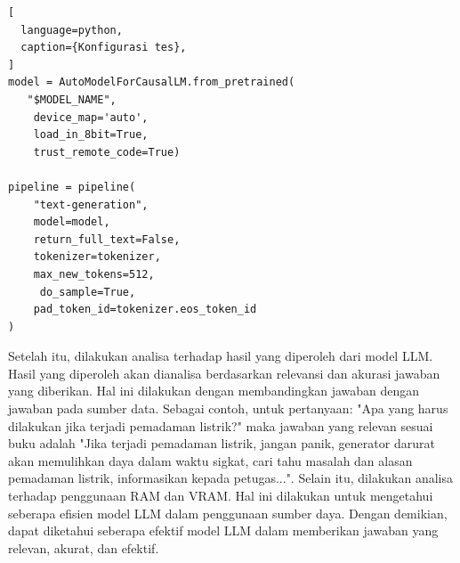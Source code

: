 \begin{lstlisting}[
  language=python,
  caption={Konfigurasi tes},
]
model = AutoModelForCausalLM.from_pretrained(
   "$MODEL_NAME",
    device_map='auto',
    load_in_8bit=True,
    trust_remote_code=True)

pipeline = pipeline(
    "text-generation",
    model=model,
    return_full_text=False,
    tokenizer=tokenizer,
    max_new_tokens=512,
     do_sample=True,
    pad_token_id=tokenizer.eos_token_id
)
\end{lstlisting}

Setelah itu, dilakukan analisa terhadap hasil yang diperoleh dari model LLM. Hasil yang diperoleh akan dianalisa berdasarkan relevansi dan akurasi jawaban yang diberikan. Hal ini dilakukan dengan membandingkan jawaban dengan jawaban pada sumber data. Sebagai contoh, untuk pertanyaan: "Apa yang harus dilakukan jika terjadi pemadaman listrik?"  maka jawaban yang relevan sesuai buku adalah "Jika terjadi pemadaman listrik, jangan panik, generator darurat akan memulihkan daya dalam waktu sigkat, cari tahu masalah dan alasan pemadaman listrik, informasikan kepada petugas...". Selain itu, dilakukan analisa terhadap penggunaan RAM dan VRAM. Hal ini dilakukan untuk mengetahui seberapa efisien model LLM dalam penggunaan sumber daya. Dengan demikian, dapat diketahui seberapa efektif model LLM dalam memberikan jawaban yang relevan, akurat, dan efektif.







